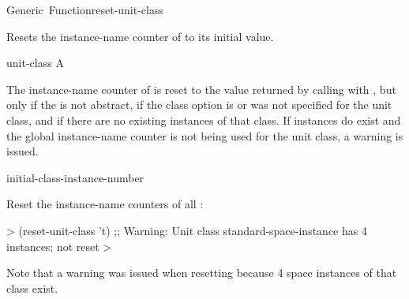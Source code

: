 \documentclass[10pt,twoside,english,pdftex]{article}
\begin{document}

\begin{functiondoc}{Generic~Function}{reset-unit-class}%
  {}

\fnsyntax

\fnpurpose Resets the  instance-name counter of
 to its initial value.

\fnmethods
{}%
  {\code{(} }
%
  {\code{(} }
%
  {\code{(} }

\fnpackage {}

\fnmodule {}

\fnargs
\begin{args}{unit-class}
 A 
\end{args}

%
%
\fndescription
%
The  instance-name counter of  is reset to
the value returned by calling \textbf{}
with , but only if the  is not abstract, if
the  class option is \nil{} or was not
specified for the unit class, and if there are no existing instances of that
class.  If instances do exist and the global instance-name counter is not
being used for the unit class, a warning is issued.

\begin{alsos}{initial-class-instance-number}
\end{alsos}

\fnexample Reset the instance-name counters of all :
%
\W\supp
\begin{example}
  > (reset-unit-class 't)
  ;; Warning: Unit class standard-space-instance has 4 instances; not reset
  >
\end{example}
%
Note that a warning was issued when resetting
\textbf{} because 4 space instances of
that class exist.

\end{functiondoc}
\end{document}
